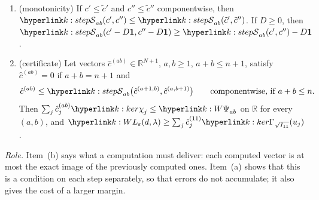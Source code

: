 \documentclass[11pt]{article}
\newcommand{\R}{\mathbb{R}}
\newcommand{\1}{\mathbf{1}}
\begin{document}
\begin{lemma}\label{lem:K2-step}
\begin{enumerate}
\item[(a)] (monotonicity) If $c'\le\tilde c'$ and $c''\le\tilde c''$ componentwise, then $\kS_{ab}(c',c'')\le\kS_{ab}(\tilde c',\tilde c'')$. If $D\ge0$, then
$\kS_{ab}(c'-D\1,c''-D\1)\ge\kS_{ab}(c',c'')-D\1$.
\item[(b)] (certificate) Let vectors $\hat c^{(ab)}\in\R^{N+1}$, $a,b\ge1$, $a+b\le n+1$, satisfy $\hat c^{(ab)}=0$ if $a+b=n+1$ and
\[
\hat c^{(ab)}\le\kS_{ab}\big(\hat c^{(a+1,b)},\hat c^{(a,b+1)}\big)\qquad\text{componentwise, if }a+b\le n.
\]
Then $\sum_j\hat c^{(ab)}_j\kchi_j\le\kW_{ab}$ on $\R$ for every $(a,b)$, and $\kL(d,\lambda)\ge\sum_j\hat c^{(11)}_j\kGam_{\sqrt{I_{11}}}(u_j)$.
\end{enumerate}
\end{lemma}
\noindent\textit{Role.} Item~(b) says what a computation must deliver: each computed vector is at most the exact image of the previously computed ones. Item~(a) shows
that this is a condition on each step separately, so that errors do not accumulate; it also gives the cost of a larger margin.
\end{document}
